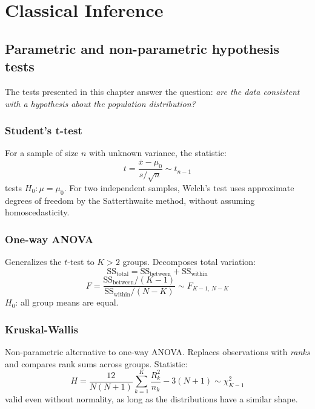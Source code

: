 \chapter{Classical Inference}
\label{cap:inferencia}

\section{Parametric and non-parametric hypothesis tests}

The tests presented in this chapter answer the question: \emph{are the data
consistent with a hypothesis about the population distribution?}

\subsection*{Student's t-test}

For a sample of size $n$ with unknown variance, the statistic:
\[
  t = \frac{\bar{x} - \mu_0}{s / \sqrt{n}} \sim t_{n-1}
\]
tests $H_0: \mu = \mu_0$. For two independent samples, Welch's test
uses approximate degrees of freedom by the Satterthwaite method, without
assuming homoscedasticity.

\subsection*{One-way ANOVA}

Generalizes the $t$-test to $K > 2$ groups. Decomposes total variation:
\[
  \text{SS}_{\text{total}} = \text{SS}_{\text{between}} + \text{SS}_{\text{within}}
\]
\[
  F = \frac{\text{SS}_{\text{between}} / (K-1)}{\text{SS}_{\text{within}} / (N-K)}
  \sim F_{K-1,\, N-K}
\]
$H_0$: all group means are equal.

\subsection*{Kruskal-Wallis}

Non-parametric alternative to one-way ANOVA. Replaces observations with
\emph{ranks} and compares rank sums across groups. Statistic:
\[
  H = \frac{12}{N(N+1)} \sum_{k=1}^K \frac{R_k^2}{n_k} - 3(N+1) \sim \chi^2_{K-1}
\]
valid even without normality, as long as the distributions have a similar shape.

